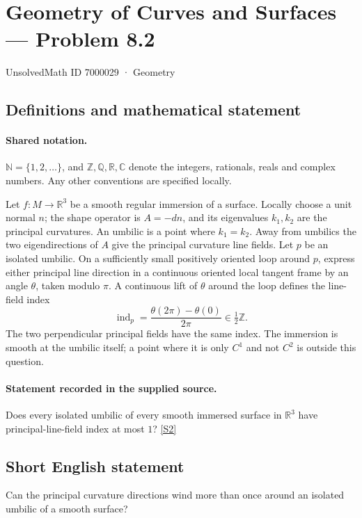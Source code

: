 \documentclass[11pt]{article}
\newcommand{\sref}[2]{\hyperlink{source:#1:#2}{[S#2]}}
\begin{document}
\setcounter{section}{7000028}
\section{Geometry of Curves and Surfaces — Problem 8.2}\label{7000029}
{\small\sffamily UnsolvedMath ID 7000029 · Geometry}
\subsection{Definitions and mathematical statement}

\paragraph{Shared notation.}$\mathbb N=\{1,2,\ldots\}$, and $\mathbb Z,\mathbb Q,\mathbb R,\mathbb C$ denote the integers, rationals, reals and complex numbers. Any other conventions are specified locally.


Let $f:M\to\mathbb R^3$ be a smooth regular immersion of a surface. Locally choose a unit normal $n$; the shape operator is $A=-dn$, and its eigenvalues $k_1,k_2$ are the principal curvatures. An umbilic is a point where $k_1=k_2$. Away from umbilics the two eigendirections of $A$ give the principal curvature line fields. Let $p$ be an isolated umbilic. On a sufficiently small positively oriented loop around $p$, express either principal line direction in a continuous oriented local tangent frame by an angle $\theta$, taken modulo $\pi$. A continuous lift of $\theta$ around the loop defines the line-field index
\[\operatorname{ind}_p=\frac{\theta(2\pi)-\theta(0)}{2\pi}\in\tfrac12\mathbb Z.\]
The two perpendicular principal fields have the same index. The immersion is smooth at the umbilic itself; a point where it is only $C^1$ and not $C^2$ is outside this question.
\paragraph{Statement recorded in the supplied source.}
Does every isolated umbilic of every smooth immersed surface in $\mathbb R^3$ have principal-line-field index at most $1$? \sref{7000029}{2}
\subsection{Short English statement}
Can the principal curvature directions wind more than once around an isolated umbilic of a smooth surface?
\end{document}
